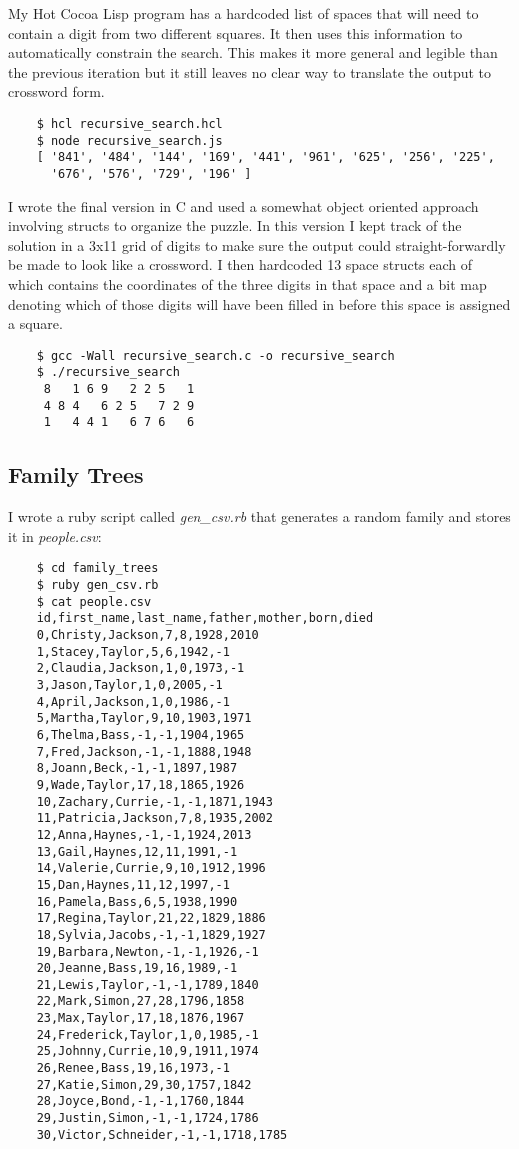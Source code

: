 \documentclass[11pt]{article}
\begin{document}
   My Hot Cocoa Lisp program has a hardcoded list of spaces that will
   need to contain a digit from two different squares.  It then uses
   this information to automatically constrain the search.  This makes
   it more general and legible than the previous iteration but it
   still leaves no clear way to translate the output to crossword
   form.
   
\begin{verbatim}
    $ hcl recursive_search.hcl
    $ node recursive_search.js
    [ '841', '484', '144', '169', '441', '961', '625', '256', '225',
      '676', '576', '729', '196' ]
\end{verbatim}

   
   I wrote the final version in C and used a somewhat object oriented
   approach involving structs to organize the puzzle.  In this version
   I kept track of the solution in a 3x11 grid of digits to make sure
   the output could straight-forwardly be made to look like a
   crossword.  I then hardcoded 13 space structs each of which
   contains the coordinates of the three digits in that space and a
   bit map denoting which of those digits will have been filled in
   before this space is assigned a square.
   
\begin{verbatim}
    $ gcc -Wall recursive_search.c -o recursive_search
    $ ./recursive_search
     8   1 6 9   2 2 5   1
     4 8 4   6 2 5   7 2 9
     1   4 4 1   6 7 6   6
\end{verbatim}

   
\subsection*{Family Trees}
\label{sec-2.2}

   
   I wrote a ruby script called \emph{gen\_csv.rb} that generates a random
   family and stores it in \emph{people.csv}:
   
\begin{verbatim}
    $ cd family_trees
    $ ruby gen_csv.rb
    $ cat people.csv
    id,first_name,last_name,father,mother,born,died
    0,Christy,Jackson,7,8,1928,2010
    1,Stacey,Taylor,5,6,1942,-1
    2,Claudia,Jackson,1,0,1973,-1
    3,Jason,Taylor,1,0,2005,-1
    4,April,Jackson,1,0,1986,-1
    5,Martha,Taylor,9,10,1903,1971
    6,Thelma,Bass,-1,-1,1904,1965
    7,Fred,Jackson,-1,-1,1888,1948
    8,Joann,Beck,-1,-1,1897,1987
    9,Wade,Taylor,17,18,1865,1926
    10,Zachary,Currie,-1,-1,1871,1943
    11,Patricia,Jackson,7,8,1935,2002
    12,Anna,Haynes,-1,-1,1924,2013
    13,Gail,Haynes,12,11,1991,-1
    14,Valerie,Currie,9,10,1912,1996
    15,Dan,Haynes,11,12,1997,-1
    16,Pamela,Bass,6,5,1938,1990
    17,Regina,Taylor,21,22,1829,1886
    18,Sylvia,Jacobs,-1,-1,1829,1927
    19,Barbara,Newton,-1,-1,1926,-1
    20,Jeanne,Bass,19,16,1989,-1
    21,Lewis,Taylor,-1,-1,1789,1840
    22,Mark,Simon,27,28,1796,1858
    23,Max,Taylor,17,18,1876,1967
    24,Frederick,Taylor,1,0,1985,-1
    25,Johnny,Currie,10,9,1911,1974
    26,Renee,Bass,19,16,1973,-1
    27,Katie,Simon,29,30,1757,1842
    28,Joyce,Bond,-1,-1,1760,1844
    29,Justin,Simon,-1,-1,1724,1786
    30,Victor,Schneider,-1,-1,1718,1785
\end{verbatim}
\end{document}

